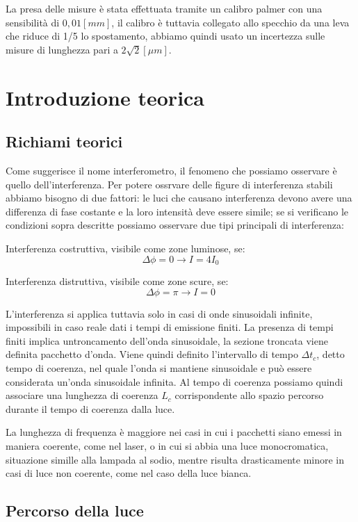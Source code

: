 \documentclass{article}
\begin{document}
La presa delle misure è stata effettuata tramite un calibro palmer con una sensibilità di $0,01[mm]$, il calibro è tuttavia collegato allo specchio da una leva che riduce di 1/5 lo spostamento, abbiamo quindi usato un incertezza sulle misure di lunghezza pari a $2 \sqrt2 [\mu m]$.




\section{Introduzione teorica}
\subsection{Richiami teorici}
Come suggerisce il nome interferometro, il fenomeno che possiamo osservare è quello dell'interferenza. 
Per potere ossrvare delle figure di interferenza stabili abbiamo bisogno di due fattori: le luci che causano interferenza devono avere una differenza di fase costante e la loro intensità deve essere simile; se si verificano le condizioni sopra descritte possiamo osservare due tipi principali di interferenza:

Interferenza costruttiva, visibile come zone luminose, se:
\[ \Delta \phi = 0 \rightarrow I = 4 I_0 \]

Interferenza distruttiva, visibile come zone scure, se: 
\[ \Delta \phi = \pi \rightarrow I = 0 \]

L'interferenza si applica tuttavia solo in casi di onde sinusoidali infinite, impossibili in caso reale dati i tempi di emissione finiti. La presenza di tempi finiti implica untroncamento dell'onda sinusoidale, la sezione troncata viene definita pacchetto d'onda. Viene quindi definito l'intervallo di tempo $\Delta t_c$, detto tempo di coerenza, nel quale l'onda si mantiene sinusoidale e può essere considerata un'onda sinusoidale infinita. Al tempo di coerenza possiamo quindi associare una lunghezza di coerenza $L_c$ corrispondente allo spazio percorso durante il tempo di coerenza dalla luce.

La lunghezza di frequenza è maggiore nei casi in cui i pacchetti siano emessi in maniera coerente, come nel laser, o in cui si abbia una luce monocromatica, situazione simille alla lampada al sodio, mentre risulta drasticamente minore in casi di luce non coerente, come nel caso della luce bianca.


\subsection{Percorso della luce}
\end{document}
